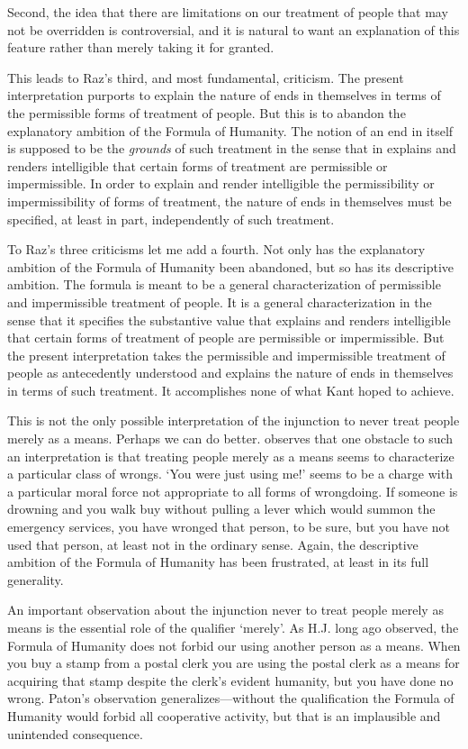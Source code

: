 \documentclass[a4paper,12pt]{article}
\begin{document}
Second, the idea that there are limitations on our treatment of people that may not be overridden is controversial, and it is natural to want an explanation of this feature rather than merely taking it for granted.

This leads to Raz's third, and most fundamental, criticism. The present interpretation purports to explain the nature of ends in themselves in terms of the permissible forms of treatment of people. But this is to abandon the explanatory ambition of the Formula of Humanity. The notion of an end in itself is supposed to be the \emph{grounds} of such treatment in the sense that in explains and renders intelligible that certain forms of treatment are permissible or impermissible. In order to explain and render intelligible the permissibility or impermissibility of forms of treatment, the nature of ends in themselves must be specified, at least in part, independently of such treatment.

To Raz's three criticisms let me add a fourth. Not only has the explanatory ambition of the Formula of Humanity been abandoned, but so has its descriptive ambition. The formula is meant to be a general characterization of permissible and impermissible treatment of people. It is a general characterization in the sense that it specifies the substantive value that explains and renders intelligible that certain forms of treatment of people are permissible or impermissible. But the present interpretation takes the permissible and impermissible treatment of people as antecedently understood and explains the nature of ends in themselves in terms of such treatment. It accomplishes none of what Kant hoped to achieve.

This is not the only possible interpretation of the injunction to never treat people merely as a means. Perhaps we can do better. \cite{Scanlon:2004ac} observes that one obstacle to such an interpretation is that treating people merely as a means seems to characterize a particular class of wrongs. `You were just using me!' seems to be a charge with a particular moral force not appropriate to all forms of wrongdoing. If someone is drowning and you walk buy without pulling a lever which would summon the emergency services, you have wronged that person, to be sure, but you have not used that person, at least not in the ordinary sense. Again, the descriptive ambition of the Formula of Humanity has been frustrated, at least in its full generality. 

An important observation about the injunction never to treat people merely as means is the essential role of the qualifier `merely'. As H.J. \citet{Paton:1946dz} long ago observed, the Formula of Humanity does not forbid our using another person as a means. When you buy a stamp from a postal clerk you are using the postal clerk as a means for acquiring that stamp despite the clerk's evident humanity, but you have done no wrong. Paton's observation generalizes---without the qualification the Formula of Humanity would forbid all cooperative activity, but that is an implausible and unintended consequence.
\end{document}
